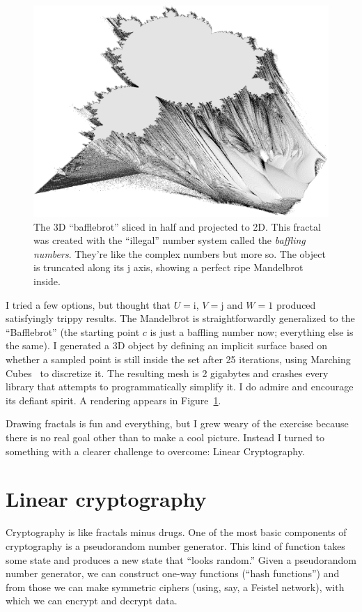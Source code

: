 \documentclass[twocolumn]{article}
\begin{document}
\begin{figure}[htp]
  \includegraphics[width=0.95 \linewidth]{bafflebrot}
  \caption{
    The 3D ``bafflebrot'' sliced in half and projected to 2D.
    This fractal was created with the ``illegal'' number system
    called the {\it baffling numbers}. They're like the complex
    numbers but more so. The object is truncated along its
    $\textrm{j}$ axis, showing a perfect ripe Mandelbrot inside.
  } \label{fig:bafflebrot}
\end{figure}

I tried a few options, but thought that $U = \textrm{i}$, $V =
\textrm{j}$ and $W = 1$ produced satisfyingly trippy results. The
Mandelbrot is straightforwardly generalized to the ``Bafflebrot'' (the
starting point $c$ is just a baffling number now; everything else is
the same). I generated a 3D object by defining an implicit surface
based on whether a sampled point is still inside the set after 25
iterations, using Marching Cubes~\cite{lorensen1987marching} to
discretize it. The resulting mesh is 2 gigabytes and crashes every
library that attempts to programmatically simplify it. I do admire and
encourage its defiant spirit. A rendering appears in
Figure~\ref{fig:bafflebrot}.

\medskip
Drawing fractals is fun and everything, but I grew weary of the
exercise because there is no real goal other than to make a cool
picture. Instead I turned to something with a clearer challenge to
overcome: Linear Cryptography.

\section{Linear cryptography} \label{sec:eightbitchoppy}
Cryptography is like fractals minus drugs. One of the most basic
components of cryptography is a pseudorandom number generator. This
kind of function takes some state and produces a new state that
``looks random.'' Given a pseudorandom number generator, we can
construct one-way functions (``hash functions'') and from those we can
make symmetric ciphers (using, say, a Feistel network), with which we
can encrypt and decrypt data.
\end{document}
